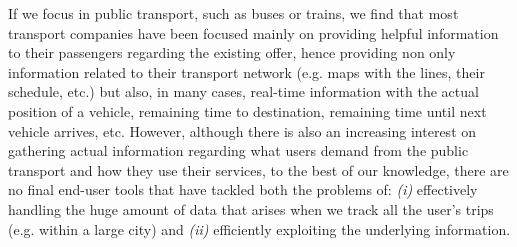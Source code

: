     If we focus in public transport, such as buses or trains, we find that most transport companies have been focused mainly on providing helpful information to their passengers regarding the existing offer, hence providing non only information related to their transport network (e.g. maps with the lines, their schedule, etc.) but also, in many cases, real-time information with the actual position of a vehicle, remaining time to destination, remaining time until next vehicle arrives, etc. 
    However, although there is also an increasing interest on gathering actual information regarding what users demand from the public transport and how they use their services, to the best of our knowledge, there are no final end-user tools that have tackled both the problems of: {\em (i)} effectively handling the huge amount of data that arises when we track all the user's trips (e.g. within a large city) and {\em (ii)} efficiently exploiting the underlying information.
    
